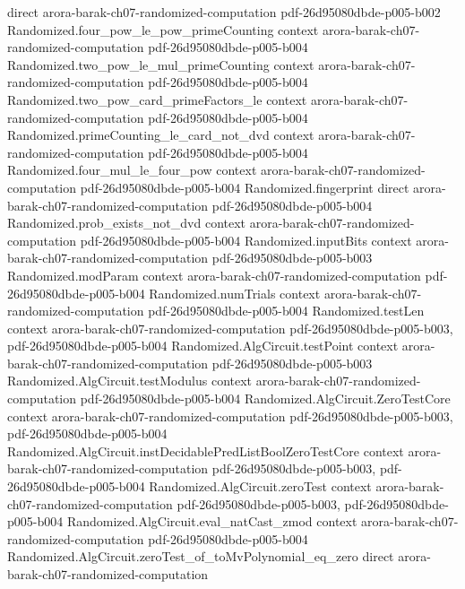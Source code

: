 \begin{theorem}
  {direct}
  {arora-barak-ch07-randomized-computation}
  {pdf-26d95080dbde-p005-b002}
\proofstep
  {Randomized.four_pow_le_pow_primeCounting}
  {context}
  {arora-barak-ch07-randomized-computation}
  {pdf-26d95080dbde-p005-b004}
\proofstep
  {Randomized.two_pow_le_mul_primeCounting}
  {context}
  {arora-barak-ch07-randomized-computation}
  {pdf-26d95080dbde-p005-b004}
\proofstep
  {Randomized.two_pow_card_primeFactors_le}
  {context}
  {arora-barak-ch07-randomized-computation}
  {pdf-26d95080dbde-p005-b004}
\proofstep
  {Randomized.primeCounting_le_card_not_dvd}
  {context}
  {arora-barak-ch07-randomized-computation}
  {pdf-26d95080dbde-p005-b004}
\proofstep
  {Randomized.four_mul_le_four_pow}
  {context}
  {arora-barak-ch07-randomized-computation}
  {pdf-26d95080dbde-p005-b004}
\proofstep
  {Randomized.fingerprint}
  {direct}
  {arora-barak-ch07-randomized-computation}
  {pdf-26d95080dbde-p005-b004}
\proofstep
  {Randomized.prob_exists_not_dvd}
  {context}
  {arora-barak-ch07-randomized-computation}
  {pdf-26d95080dbde-p005-b004}
\proofstep
  {Randomized.inputBits}
  {context}
  {arora-barak-ch07-randomized-computation}
  {pdf-26d95080dbde-p005-b003}
\proofstep
  {Randomized.modParam}
  {context}
  {arora-barak-ch07-randomized-computation}
  {pdf-26d95080dbde-p005-b004}
\proofstep
  {Randomized.numTrials}
  {context}
  {arora-barak-ch07-randomized-computation}
  {pdf-26d95080dbde-p005-b004}
\proofstep
  {Randomized.testLen}
  {context}
  {arora-barak-ch07-randomized-computation}
  {pdf-26d95080dbde-p005-b003,
    pdf-26d95080dbde-p005-b004}
\proofstep
  {Randomized.AlgCircuit.testPoint}
  {context}
  {arora-barak-ch07-randomized-computation}
  {pdf-26d95080dbde-p005-b003}
\proofstep
  {Randomized.AlgCircuit.testModulus}
  {context}
  {arora-barak-ch07-randomized-computation}
  {pdf-26d95080dbde-p005-b004}
\proofstep
  {Randomized.AlgCircuit.ZeroTestCore}
  {context}
  {arora-barak-ch07-randomized-computation}
  {pdf-26d95080dbde-p005-b003,
    pdf-26d95080dbde-p005-b004}
\proofstep
  {Randomized.AlgCircuit.instDecidablePredListBoolZeroTestCore}
  {context}
  {arora-barak-ch07-randomized-computation}
  {pdf-26d95080dbde-p005-b003,
    pdf-26d95080dbde-p005-b004}
\proofstep
  {Randomized.AlgCircuit.zeroTest}
  {context}
  {arora-barak-ch07-randomized-computation}
  {pdf-26d95080dbde-p005-b003,
    pdf-26d95080dbde-p005-b004}
\proofstep
  {Randomized.AlgCircuit.eval_natCast_zmod}
  {context}
  {arora-barak-ch07-randomized-computation}
  {pdf-26d95080dbde-p005-b004}
\proofstep
  {Randomized.AlgCircuit.zeroTest_of_toMvPolynomial_eq_zero}
  {direct}
  {arora-barak-ch07-randomized-computation}

\end{theorem}
